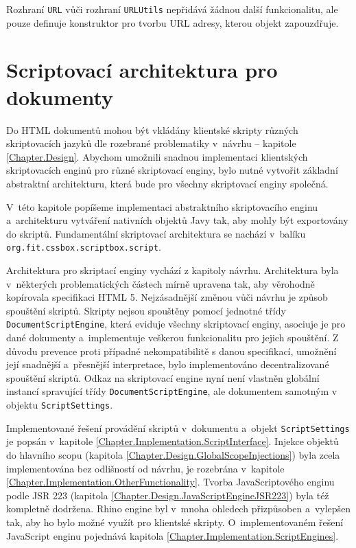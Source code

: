 Rozhraní \texttt{URL} vůči rozhraní \texttt{URLUtils} nepřidává žádnou další funkcionalitu, ale pouze definuje konstruktor pro tvorbu URL adresy, kterou objekt zapouzdřuje.

\section{Scriptovací architektura pro dokumenty}
\label{Chapter.Implementation.ScriptingArchitecture}

Do HTML dokumentů mohou být vkládány klientské skripty různých skriptovacích jazyků dle rozebrané problematiky v~návrhu -- kapitole \ref{Chapter.Design}. Abychom umožnili snadnou implementaci klientských skriptovacích enginů pro různé skriptovací enginy, bylo nutné vytvořit základní abstraktní architekturu, která bude pro všechny skriptovací enginy společná. 

V~této kapitole popíšeme implementaci abstraktního skriptovacího enginu a~architekturu vytváření nativních objektů Javy tak, aby mohly být exportovány do skriptů. Fundamentální skriptovací architektura se nachází v~balíku \texttt{org.fit.cssbox.scriptbox.script}. 

Architektura pro skriptací enginy vychází z kapitoly návrhu. Architektura byla v~některých problematických částech mírně upravena tak, aby věrohodně kopírovala specifikaci HTML 5. Nejzásadnější změnou vůči návrhu je způsob spouštění skriptů. Skripty nejsou spouštěny pomocí jednotné třídy \texttt{DocumentScriptEngine}, která eviduje všechny skriptovací enginy, asociuje je pro dané dokumenty a~implementuje veškerou funkcionalitu pro jejich spouštění. Z důvodu prevence proti případné nekompatibilitě s danou specifikací, umožnění její snadnější a~přesnější interpretace, bylo implementováno decentralizované spouštění skriptů. Odkaz na skriptovací engine nyní není vlastněn globální instancí spravující třídy \texttt{DocumentScriptEngine}, ale dokumentem samotným v objektu \texttt{ScriptSettings}.

Implementované řešení provádění skriptů v~dokumentu a~objekt \texttt{ScriptSettings} je popsán v~kapitole \ref{Chapter.Implementation.ScriptInterface}. Injekce objektů do hlavního scopu (kapitola \ref{Chapter.Design.GlobalScopeInjections}) byla zcela implementována bez odlišností od návrhu, je rozebrána v~kapitole \ref{Chapter.Implementation.OtherFunctionality}. Tvorba JavaScriptového enginu podle JSR 223 (kapitola \ref{Chapter.Design.JavaScriptEngineJSR223}) byla též kompletně dodržena. Rhino engine byl v~mnoha ohledech přizpůsoben a~vylepšen tak, aby ho bylo možné využít pro klientské skripty. O~implementovaném řešení JavaScript enginu pojednává kapitola \ref{Chapter.Implementation.ScriptEngines}.

